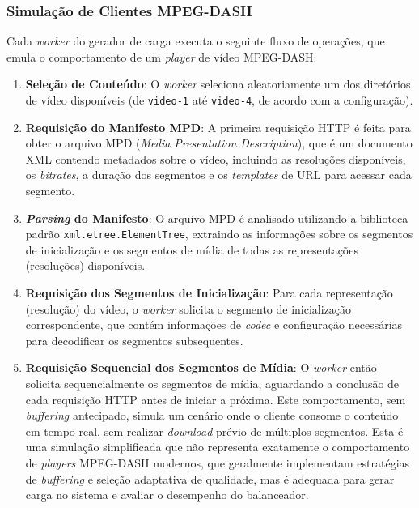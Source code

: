 \subsubsection{Simulação de Clientes MPEG-DASH}

Cada \textit{worker} do gerador de carga executa o seguinte fluxo de operações, que emula o comportamento de um \textit{player} de vídeo MPEG-DASH:

\begin{enumerate}
    \item \textbf{Seleção de Conteúdo}: O \textit{worker} seleciona aleatoriamente um dos diretórios de vídeo disponíveis (de \texttt{video-1} até \texttt{video-4}, de acordo com a configuração).
    
    \item \textbf{Requisição do Manifesto MPD}: A primeira requisição HTTP é feita para obter o arquivo MPD (\textit{Media Presentation Description}), que é um documento XML contendo metadados sobre o vídeo, incluindo as resoluções disponíveis, os \textit{bitrates}, a duração dos segmentos e os \textit{templates} de URL para acessar cada segmento.
    
    \item \textbf{\textit{Parsing} do Manifesto}: O arquivo MPD é analisado utilizando a biblioteca padrão \texttt{xml.etree.ElementTree}, extraindo as informações sobre os segmentos de inicialização e os segmentos de mídia de todas as representações (resoluções) disponíveis.
    
    \item \textbf{Requisição dos Segmentos de Inicialização}: Para cada representação (resolução) do vídeo, o \textit{worker} solicita o segmento de inicialização correspondente, que contém informações de \textit{codec} e configuração necessárias para decodificar os segmentos subsequentes.
    
    \item \textbf{Requisição Sequencial dos Segmentos de Mídia}: O \textit{worker} então solicita sequencialmente os segmentos de mídia, aguardando a conclusão de cada requisição HTTP antes de iniciar a próxima. Este comportamento, sem \textit{buffering} antecipado, simula um cenário onde o cliente consome o conteúdo em tempo real, sem realizar \textit{download} prévio de múltiplos segmentos. Esta é uma simulação simplificada que não representa exatamente o comportamento de \textit{players} MPEG-DASH modernos, que geralmente implementam estratégias de \textit{buffering} e seleção adaptativa de qualidade, mas é adequada para gerar carga no sistema e avaliar o desempenho do balanceador.
\end{enumerate}


